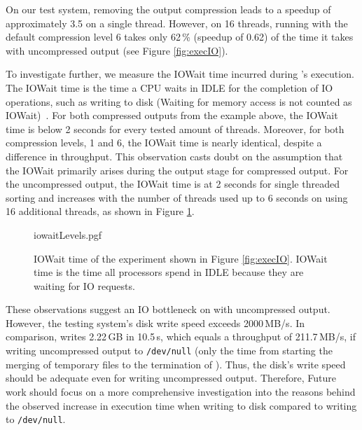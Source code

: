 On our test system, removing the output compression leads to a speedup of approximately 3.5 on a single thread. However, on 16 threads, running \sort with the default compression level 6 takes only 62\,\% (speedup of 0.62) of the time it takes with uncompressed output (see Figure \ref{fig:execIO}).

To investigate further, we measure the IOWait time incurred during \sort's execution. The IOWait time is the time a CPU waits in IDLE for the completion of IO operations, such as writing to disk (Waiting for memory access is not counted as IOWait)~\cite{noauthor_iostat1_nodate}. For both compressed outputs from the example above, the IOWait time is below 2 seconds for every tested amount of threads. Moreover, for both compression levels, 1 and 6, the IOWait time is nearly identical, despite a difference in throughput. This observation casts doubt on the assumption that the IOWait primarily arises during the output stage for compressed output. For the uncompressed output, the IOWait time is at 2 seconds for single threaded sorting and increases with the number of threads used up to 6 seconds on using 16 additional threads, as shown in Figure \ref{fig:iowait}.
\begin{figure}
        {iowaitLevels.pgf}
    \caption{IOWait time of the experiment shown in Figure \ref{fig:execIO}. IOWait time is the time all processors spend in IDLE because they are waiting for IO requests. \threads \points 
    }
    \label{fig:iowait}
\end{figure}

These observations suggest an IO bottleneck on \sort with uncompressed output. However, the testing system's disk write speed exceeds 2000\,MB/s. In comparison, \sort writes 2.22\,GB in 10.5\,s, which equals a throughput of 211.7\,MB/s, if writing uncompressed output to \texttt{/dev/null} (only the time from starting the merging of temporary files to the termination of \sort). Thus, the disk's write speed should be adequate even for writing uncompressed output. Therefore, Future work should focus on a more comprehensive investigation into the reasons behind the observed increase in execution time when writing to disk compared to writing to \texttt{/dev/null}.



